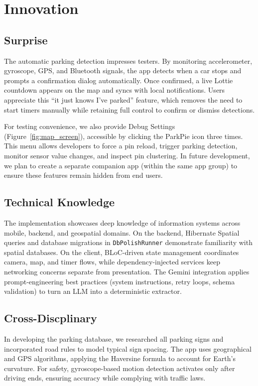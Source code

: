 \section{Innovation}

\subsection{Surprise}
The automatic parking detection impresses testers. By monitoring accelerometer, gyroscope, GPS, and Bluetooth signals, the app detects when a car stops and prompts a confirmation dialog automatically. Once confirmed, a live Lottie countdown appears on the map and syncs with local notifications. Users appreciate this “it just knows I’ve parked” feature, which removes the need to start timers manually while retaining full control to confirm or dismiss detections.

For testing convenience, we also provide Debug Settings (Figure~\ref{fig:map_screen}), accessible by clicking the ParkPie icon three times. This menu allows developers to force a pin reload, trigger parking detection, monitor sensor value changes, and inspect pin clustering. In future development, we plan to create a separate companion app (within the same app group) to ensure these features remain hidden from end users.

\subsection{Technical Knowledge}

The implementation showcases deep knowledge of information systems across mobile, backend, and geospatial domains. On the backend, Hibernate Spatial queries and database migrations in \texttt{DbPolishRunner} demonstrate familiarity with spatial databases. On the client, BLoC-driven state management coordinates camera, map, and timer flows, while dependency-injected services keep networking concerns separate from presentation. The Gemini integration applies prompt-engineering best practices (system instructions, retry loops, schema validation) to turn an LLM into a deterministic extractor.


\subsection{Cross-Discplinary}

In developing the parking database, we researched all parking signs and incorporated road rules to model typical sign spacing. The app uses geographical and GPS algorithms, applying the Haversine formula to account for Earth’s curvature. For safety, gyroscope-based motion detection activates only after driving ends, ensuring accuracy while complying with traffic laws.

